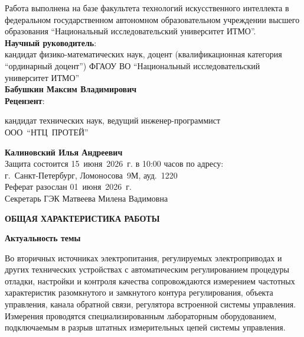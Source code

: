 \documentclass[a4paper, 14pt]{extarticle}
\newcommand{\leftnohyphens}[1]{%
  {\raggedright\hyphenpenalty=10000\exhyphenpenalty=10000 #1\par}%
}
\begin{document}
    \fontsize{14pt}{14pt}\selectfont	
    \noindent Работа выполнена на базе факультета технологий искусственного интеллекта в федеральном государственном автономном образовательном учреждении высшего образования \enquote{Национальный исследовательский университет ИТМО}.
    \vspace{3mm}\\
    \textbf{Научный руководитель}:\\ 
    кандидат физико-математических наук, доцент (квалификационная категория \enquote{ординарный доцент}) ФГАОУ ВО \enquote{Национальный исследовательский университет ИТМО}\\ 
    \textbf{Бабушкин Максим Владимирович}
    \vspace{3mm}\\
    \textbf{Рецензент}:\par
    \leftnohyphens{кандидат технических наук, ведущий инженер-программист ООО~\enquote{НТЦ~ПРОТЕЙ}}
    \noindent \textbf{Калиновский Илья Андреевич}
    \vspace{10mm}\\
    Защита состоится 15~июня~2026~г. в 10:00 часов по адресу:\\
    г.~Санкт-Петербург, Ломоносова~9М, ауд.~1220
    \vspace{20mm}\\
    \noindent Реферат разослан 01~июня~2026~г.
    \vspace{3mm}\\
    \fontsize{14pt}{15pt}\selectfont Секретарь ГЭК \hfill Матвеева Милена Вадимовна

    \newpage
    \fontsize{14pt}{21pt}\selectfont

    {\bfseries \centering ОБЩАЯ ХАРАКТЕРИСТИКА РАБОТЫ\par}
    \vspace{10pt}

    \noindent\textbf{Актуальность темы}\par
    Во вторичных источниках электропитания, регулируемых электроприводах и других технических устройствах с автоматическим регулированием процедуры отладки, настройки и контроля качества сопровождаются измерением частотных характеристик разомкнутого и замкнутого контура регулирования, объекта управления, канала обратной связи, регулятора встроенной системы управления. Измерения проводятся специализированным лабораторным оборудованием, подключаемым в разрыв штатных измерительных цепей системы управления.
\end{document}
